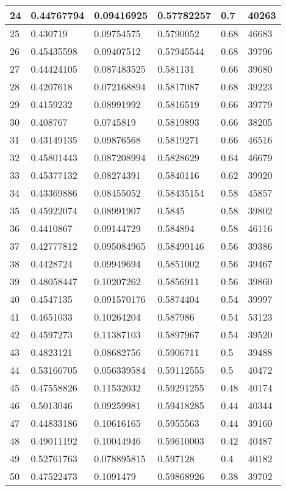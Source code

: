 \begin{longtable}{|l|l|l|l|l|l|}
24 & 0.44767794 & 0.09416925 & 0.57782257 & 0.7 & 40263 \\ \hline 
25 & 0.430719 & 0.09754575 & 0.5790052 & 0.68 & 46683 \\ \hline 
26 & 0.45435598 & 0.09407512 & 0.57945544 & 0.68 & 39796 \\ \hline 
27 & 0.44424105 & 0.087483525 & 0.581131 & 0.66 & 39680 \\ \hline 
28 & 0.4207618 & 0.072168894 & 0.5817087 & 0.68 & 39223 \\ \hline 
29 & 0.4159232 & 0.08991992 & 0.5816519 & 0.66 & 39779 \\ \hline 
30 & 0.408767 & 0.0745819 & 0.5819893 & 0.66 & 38205 \\ \hline 
31 & 0.43149135 & 0.09876568 & 0.5819271 & 0.66 & 46516 \\ \hline 
32 & 0.45801443 & 0.087208994 & 0.5828629 & 0.64 & 46679 \\ \hline 
33 & 0.45377132 & 0.08274391 & 0.5840116 & 0.62 & 39920 \\ \hline 
34 & 0.43369886 & 0.08455052 & 0.58435154 & 0.58 & 45857 \\ \hline 
35 & 0.45922074 & 0.08991907 & 0.5845 & 0.58 & 39802 \\ \hline 
36 & 0.4410867 & 0.09144729 & 0.584894 & 0.58 & 46116 \\ \hline 
37 & 0.42777812 & 0.095084965 & 0.58499146 & 0.56 & 39386 \\ \hline 
38 & 0.4428724 & 0.09949694 & 0.5851002 & 0.56 & 39467 \\ \hline 
39 & 0.48058447 & 0.10207262 & 0.5856911 & 0.56 & 39860 \\ \hline 
40 & 0.4547135 & 0.091570176 & 0.5874404 & 0.54 & 39997 \\ \hline 
41 & 0.4651033 & 0.10264204 & 0.587986 & 0.54 & 53123 \\ \hline 
42 & 0.4597273 & 0.11387103 & 0.5897967 & 0.54 & 39520 \\ \hline 
43 & 0.4823121 & 0.08682756 & 0.5906711 & 0.5 & 39488 \\ \hline 
44 & 0.53166705 & 0.056339584 & 0.59112555 & 0.5 & 40472 \\ \hline 
45 & 0.47558826 & 0.11532032 & 0.59291255 & 0.48 & 40174 \\ \hline 
46 & 0.5013046 & 0.09259981 & 0.59418285 & 0.44 & 40344 \\ \hline 
47 & 0.44833186 & 0.10616165 & 0.5955563 & 0.44 & 39160 \\ \hline 
48 & 0.49011192 & 0.10044946 & 0.59610003 & 0.42 & 40487 \\ \hline 
49 & 0.52761763 & 0.078895815 & 0.597128 & 0.4 & 40182 \\ \hline 
50 & 0.47522473 & 0.1091479 & 0.59868926 & 0.38 & 39702 \\ \hline 
\end{longtable}